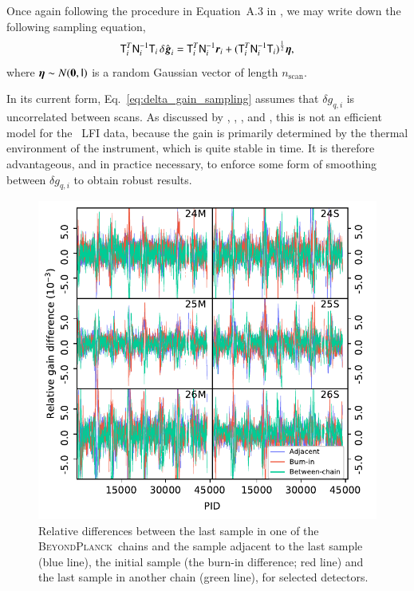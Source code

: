 \documentclass[twocolumn]{aa}
\newcommand{\T}[0]{\tens{T}}
\newcommand{\g}[0]{\vec{g}}
\newcommand{\N}[0]{\tens{N}}
\renewcommand{\r}[0]{\vec{r}}
\newcommand{\BP}{\textsc{BeyondPlanck}}
\newcommand{\qi}[0]{_{q, i}}
\begin{document}
Once again following the procedure in Equation~A.3 in \citet{bp01}, we
may write down the following sampling equation,
\begin{equation}
    \T_i^T\N_i^{-1}\T_i\,\delta \hat{\g}_i = \T_i^T\N_i^{-1}\r_i + (\T_i^T\N_i^{-1}\T_i)^{\frac{1}{2}}\vec\eta,
    \label{eq:delta_gain_sampling}
\end{equation}
where $\boldsymbol{\eta}\sim N(\boldsymbol{0},\mathsf{I})$ is a random Gaussian vector of length
$n_{\mathrm{scan}}$.

In its current form, Eq.~\eqref{eq:delta_gain_sampling} assumes that
$\delta g\qi$ is uncorrelated between scans. As discussed by
\citet{planck2013-p03f}, \citet{planck2014-a09}, \citet{planck2016-l03}, and \citet{planck2020-LVII}, this is
not an efficient model for the \Planck\ LFI data, because the gain is
primarily determined by the thermal environment of the instrument, which is
quite stable in time. It is therefore advantageous, and in practice necessary,
to enforce some form of smoothing between $\delta g\qi$ to obtain robust
results.

\begin{figure}
  \center
  \includegraphics[width=\linewidth]{figs/allpid_gains.pdf}
    \caption{Relative differences between the last sample in one of the \BP\ chains and the sample adjacent to the last sample (blue line), the initial sample (the burn-in difference; red line) and the last sample in another chain (green line), for selected detectors.}
  \label{fig:allpid_gains}
\end{figure}
\end{document}
